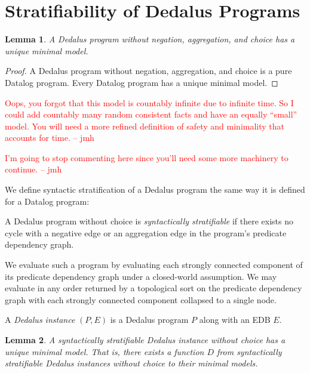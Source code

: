 \documentclass{acm_proc_article-sp-sigmod09}
\newcommand{\jmh}[1]{{\textcolor{red}{#1 -- jmh}}}
\newcommand{\wrm}[1]{{\color{BurntOrange}{#1 -- wrm}}}
\begin{document}
\section{Stratifiability of Dedalus Programs}

\newtheorem{lemma}{Lemma} 

\begin{lemma} 
%
A Dedalus program without negation, aggregation, and choice has a unique
minimal model.
%
\end{lemma}

\begin{proof} 
%
A Dedalus program without negation, aggregation, and choice is a pure Datalog
program.  Every Datalog program has a unique minimal model. \wrm{cite?  or the
audience knows this}
%
\end{proof}

\jmh{Oops, you forgot that this model is countably infinite due to infinite time. So I could add countably many random consistent facts and have an equally ``small'' model. You will need a more refined definition of safety and minimality that accounts for time.}

\jmh{I'm going to stop commenting here since you'll need some more machinery to continue.}

We define syntactic stratification of a Dedalus program the same way it is
defined for a Datalog program:

\begin{definition}
%
A Dedalus program without choice is \emph{syntactically stratifiable} if there
exists no cycle with a negative edge or an aggregation edge in the program's
predicate dependency graph.
%
\end{definition}

We evaluate such a program by evaluating each strongly connected component of
its predicate dependency graph under a closed-world assumption.  We may
evaluate in any order returned by a topological sort on the predicate
dependency graph with each strongly connected component collapsed to a single
node. \wrm{XXX: is this right?}

\begin{definition}
%
A {\em Dedalus instance} $(P,E)$ is a Dedalus program $P$ along with an EDB
$E$.
%
\end{definition}

\begin{lemma}
%
A syntactically stratifiable Dedalus instance without choice has a unique
minimal model.  That is, there exists a function $D$ from syntactically
stratifiable Dedalus instances without choice to their minimal models.
%
\end{lemma}
\end{document}

